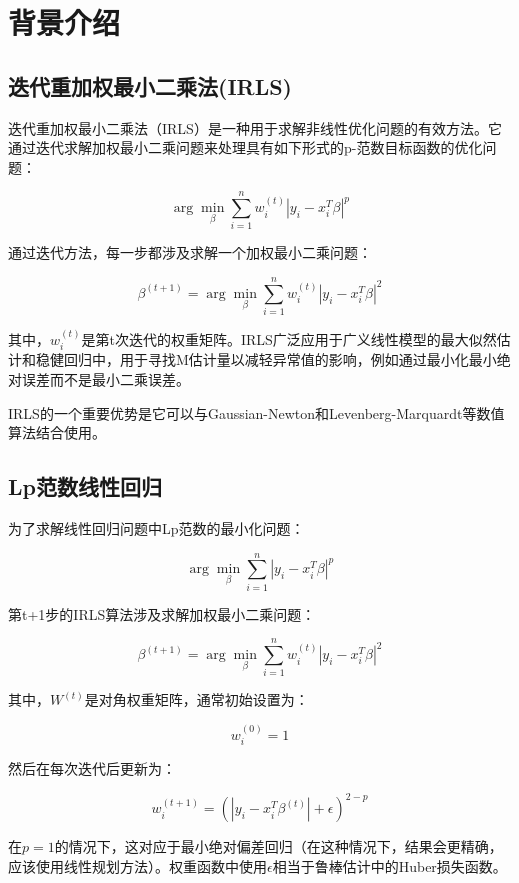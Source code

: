 \documentclass{ctexart}
\begin{document}
\section{背景介绍}

\subsection{迭代重加权最小二乘法(IRLS)}

迭代重加权最小二乘法（IRLS）是一种用于求解非线性优化问题的有效方法\cite{burrus_irls}。它通过迭代求解加权最小二乘问题来处理具有如下形式的p-范数目标函数的优化问题\cite{chartrand2008iteratively}：

\[
	\arg\min_{\beta} \sum_{i=1}^{n} w_i^{(t)} |y_i - x_i^T \beta|^p
\]

通过迭代方法，每一步都涉及求解一个加权最小二乘问题\cite{daubechies2010iteratively}：

\[
	\beta^{(t+1)} = \arg\min_{\beta} \sum_{i=1}^{n} w_i^{(t)} |y_i - x_i^T \beta|^2
\]

其中，$w_i^{(t)}$是第t次迭代的权重矩阵\cite{gentle2007matrix}。IRLS广泛应用于广义线性模型的最大似然估计和稳健回归中，用于寻找M估计量以减轻异常值的影响\cite{fox2013robust}，例如通过最小化最小绝对误差而不是最小二乘误差。

IRLS的一个重要优势是它可以与Gaussian-Newton和Levenberg-Marquardt等数值算法结合使用\cite{bjorck1996numerical}。

\subsection{Lp范数线性回归}

为了求解线性回归问题中Lp范数的最小化问题\cite{pfeil2006statistical}：

\[
	\arg\min_{\beta} \sum_{i=1}^{n} |y_i - x_i^T \beta|^p
\]

第t+1步的IRLS算法涉及求解加权最小二乘问题\cite{siggraph2011practical}：

\[
	\beta^{(t+1)} = \arg\min_{\beta} \sum_{i=1}^{n} w_i^{(t)} |y_i - x_i^T \beta|^2
\]

其中，$W^{(t)}$是对角权重矩阵，通常初始设置为：

\[
	w_i^{(0)} = 1
\]

然后在每次迭代后更新为：

\[
	w_i^{(t+1)} = \left( |y_i - x_i^T \beta^{(t)}| + \epsilon \right)^{2-p}
\]

在$p=1$的情况下，这对应于最小绝对偏差回归（在这种情况下，结果会更精确，应该使用线性规划方法）。权重函数中使用$\epsilon$相当于鲁棒估计中的Huber损失函数。
\end{document}
